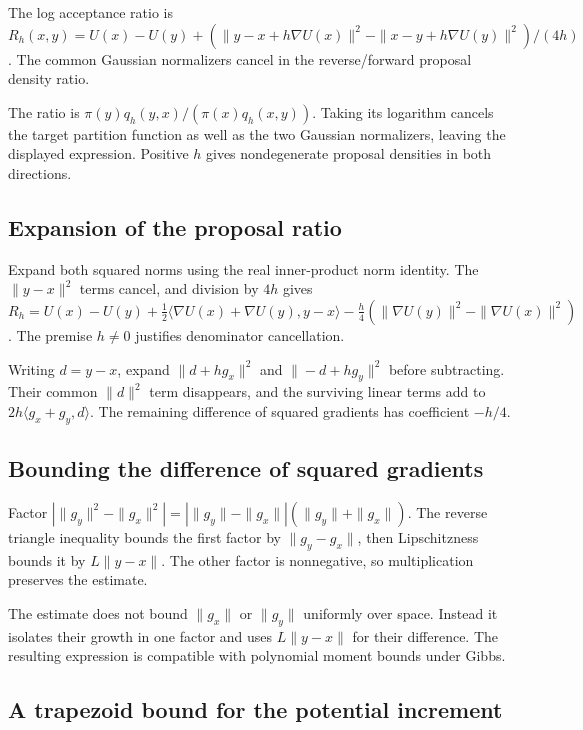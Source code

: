 \documentclass[11pt,a4paper]{article}
\begin{document}
The log acceptance ratio is \(R_h(x,y)=U(x)-U(y)+(\|y-x+h\nabla U(x)\|^2-\|x-y+h\nabla U(y)\|^2)/(4h)\). The common Gaussian normalizers cancel in the reverse/\allowbreak{}forward proposal density ratio.



The ratio is \(\pi(y)q_h(y,x)/(\pi(x)q_h(x,y))\). Taking its logarithm cancels the target partition function as well as the two Gaussian normalizers, leaving the displayed expression. Positive \(h\) gives nondegenerate proposal densities in both directions.


\subsection{\texorpdfstring{Expansion of the proposal ratio}{Expansion of the proposal ratio}}


Expand both squared norms using the real inner-product norm identity. The \(\|y-x\|^2\) terms cancel, and division by \(4h\) gives \(R_h=U(x)-U(y)+\frac12\langle\nabla U(x)+\nabla U(y),y-x\rangle-\frac h4(\|\nabla U(y)\|^2-\|\nabla U(x)\|^2)\). The premise \(h\ne0\) justifies denominator cancellation.



Writing \(d=y-x\), expand \(\|d+hg_x\|^2\) and \(\|-d+hg_y\|^2\) before subtracting. Their common \(\|d\|^2\) term disappears, and the surviving linear terms add to \(2h\langle g_x+g_y,d\rangle\). The remaining difference of squared gradients has coefficient \(-h/4\).


\subsection{\texorpdfstring{Bounding the difference of squared gradients}{Bounding the difference of squared gradients}}


Factor \(|\|g_y\|^2-\|g_x\|^2|=|\|g_y\|-\|g_x\||(\|g_y\|+\|g_x\|)\). The reverse triangle inequality bounds the first factor by \(\|g_y-g_x\|\), then Lipschitzness bounds it by \(L\|y-x\|\). The other factor is nonnegative, so multiplication preserves the estimate.



The estimate does not bound \(\|g_x\|\) or \(\|g_y\|\) uniformly over space. Instead it isolates their growth in one factor and uses \(L\|y-x\|\) for their difference. The resulting expression is compatible with polynomial moment bounds under Gibbs.


\subsection{\texorpdfstring{A trapezoid bound for the potential increment}{A trapezoid bound for the potential increment}}
\end{document}
